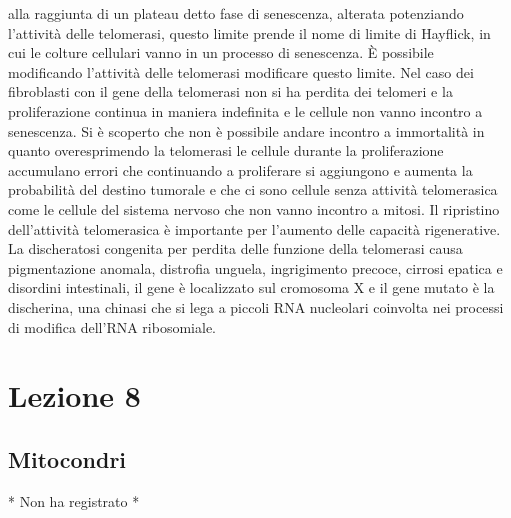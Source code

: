 alla raggiunta di un plateau detto fase di senescenza, alterata potenziando l'attivit\`a delle telomerasi, questo limite prende il nome di limite di Hayflick, in cui le colture cellulari
vanno in un processo di senescenza. \`E possibile modificando l'attivit\`a delle telomerasi modificare questo limite. Nel caso dei fibroblasti con il gene della telomerasi non si ha
perdita dei telomeri e la proliferazione continua in maniera indefinita e le cellule non vanno incontro a senescenza. Si \`e scoperto che non \`e possibile andare incontro a immortalit\`a
in quanto overesprimendo la telomerasi le cellule durante la proliferazione accumulano errori che continuando a proliferare si aggiungono e aumenta la probabilit\`a del destino tumorale 
e che ci sono cellule senza attivit\`a telomerasica come le cellule del sistema nervoso che non vanno incontro a mitosi. Il ripristino dell'attivit\`a telomerasica \`e importante 
per l'aumento delle capacit\`a rigenerative. La discheratosi congenita per perdita delle funzione della telomerasi causa pigmentazione anomala, distrofia unguela, ingrigimento precoce, 
cirrosi epatica e disordini intestinali, il gene \`e localizzato sul cromosoma X e il gene mutato \`e la discherina, una chinasi che si lega a piccoli RNA nucleolari coinvolta nei 
processi di modifica dell'RNA ribosomiale. 

\section{Lezione 8}

\subsection{Mitocondri}

* Non ha registrato *


